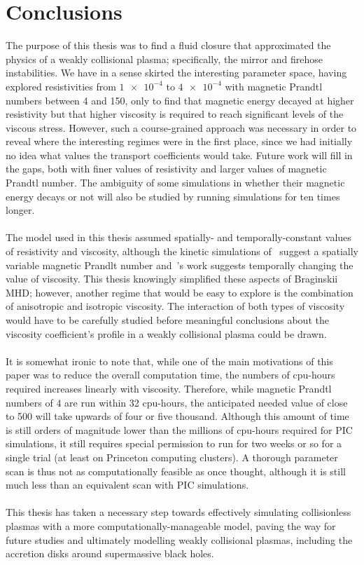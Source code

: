 \chapter{Conclusions}
The purpose of this thesis was to find a fluid closure that approximated the physics of a weakly collisional plasma; specifically, the mirror and firehose instabilities. We have in a sense skirted the interesting parameter space, having explored resistivities from $\num{1e-4}$ to $\num{4e-4}$ with magnetic Prandtl numbers between 4 and 150, only to find that magnetic energy decayed at higher resistivity but that higher viscosity is required to reach significant levels of the viscous stress. However, such a course-grained approach was necessary in order to reveal where the interesting regimes were in the first place, since we had initially no idea what values the transport coefficients would take. Future work will fill in the gaps, both with finer values of resistivity and larger values of magnetic Prandtl number. The ambiguity of some simulations in whether their magnetic energy decays or not will also be studied by running simulations for ten times longer. \\
\\
The model used in this thesis assumed spatially- and temporally-constant values of resistivity and viscosity, although the kinetic simulations of~ suggest a spatially variable magnetic Prandlt number and~'s work suggests temporally changing the value of viscosity. This thesis knowingly simplified these aspects of Braginskii MHD; however, another regime that would be easy to explore is the combination of anisotropic and isotropic viscosity. The interaction of both types of viscosity would have to be carefully studied before meaningful conclusions about the viscosity coefficient's profile in a weakly collisional plasma could be drawn.\\
\\
It is somewhat ironic to note that, while one of the main motivations of this paper was to reduce the overall computation time, the numbers of cpu-hours required increases linearly with viscosity. Therefore, while magnetic Prandtl numbers of 4 are run within 32 cpu-hours, the anticipated needed value of close to 500 will take upwards of four or five thousand. Although this amount of time is still orders of magnitude lower than the millions of cpu-hours required for PIC simulations, it still requires special permission to run for two weeks or so for a single trial (at least on Princeton computing clusters). A thorough parameter scan is thus not as computationally feasible as once thought, although it is still much less than an equivalent scan with PIC simulations. \\
\\
This thesis has taken a necessary step towards effectively simulating collisionless plasmas with a more computationally-manageable model, paving the way for future studies and ultimately modelling weakly collisional plasmas, including the accretion disks around supermassive black holes.

